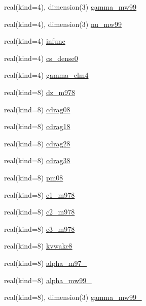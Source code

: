 \begin{DoxyCompactItemize}
real(kind=4), dimension(3) \hyperlink{namespacecanopy__air__coms_a80914f4f0e8ab35603807486ea39940e}{gamma\+\_\+mw99}
\item 
real(kind=4), dimension(3) \hyperlink{namespacecanopy__air__coms_aa50afa7c99107797c84ed294a6215584}{nu\+\_\+mw99}
\item 
real(kind=4) \hyperlink{namespacecanopy__air__coms_aaf5736b1a385a45d4fb74b566c63c036}{infunc}
\item 
real(kind=4) \hyperlink{namespacecanopy__air__coms_aa5644ca796e2926f845d04ce805b9d9c}{cs\+\_\+dense0}
\item 
real(kind=4) \hyperlink{namespacecanopy__air__coms_a5488ab681543df43e05f68b3647184ec}{gamma\+\_\+clm4}
\item 
real(kind=8) \hyperlink{namespacecanopy__air__coms_a651fd5632f3589ad9cd58b3f6eaf5bcc}{dz\+\_\+m978}
\item 
real(kind=8) \hyperlink{namespacecanopy__air__coms_af3d9254c2bae93060644975c43abb36c}{cdrag08}
\item 
real(kind=8) \hyperlink{namespacecanopy__air__coms_ac953582df4052a2a3539e145f2407c50}{cdrag18}
\item 
real(kind=8) \hyperlink{namespacecanopy__air__coms_ab8484a0111b4ddc92040d0c269e66f3a}{cdrag28}
\item 
real(kind=8) \hyperlink{namespacecanopy__air__coms_ab2603251a0323d37d22ea19a30371dbb}{cdrag38}
\item 
real(kind=8) \hyperlink{namespacecanopy__air__coms_aa4901dce15fa74bcece60c3ddfaf5a7e}{pm08}
\item 
real(kind=8) \hyperlink{namespacecanopy__air__coms_a767d679f796e74175138a9b4fad052df}{c1\+\_\+m978}
\item 
real(kind=8) \hyperlink{namespacecanopy__air__coms_a20b553578d5e2da23387a3c814f19229}{c2\+\_\+m978}
\item 
real(kind=8) \hyperlink{namespacecanopy__air__coms_a9be4a0dac0272c3475840eede662688d}{c3\+\_\+m978}
\item 
real(kind=8) \hyperlink{namespacecanopy__air__coms_aea31639861943125d6b07627648637cf}{kvwake8}
\item 
real(kind=8) \hyperlink{namespacecanopy__air__coms_aaca98abaf4f4ff986bd24a7e1ceea8a6}{alpha\+\_\+m97\+\_}
\item 
real(kind=8) \hyperlink{namespacecanopy__air__coms_a0c11f06e8905d7442da34f32fd5a1f5d}{alpha\+\_\+mw99\+\_}
\item 
real(kind=8), dimension(3) \hyperlink{namespacecanopy__air__coms_abfa660e21167dc9825089920687f3aae}{gamma\+\_\+mw99\+\_}

\end{DoxyCompactItemize}
